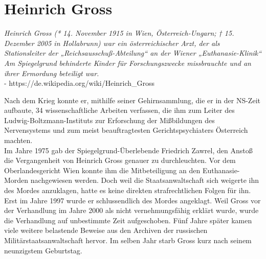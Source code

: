 \documentclass[a4paper, ngerman]{article}
\begin{document}
\section*{Heinrich Gross}

\begin{center}
    \textit{
        Heinrich Gross (* 14. November 1915 in Wien, Österreich-Ungarn; † 15. Dezember 2005 in Hollabrunn) war ein österreichischer Arzt, der als Stationsleiter der „Reichsausschuß-Abteilung“ an der Wiener
        „Euthanasie-Klinik“ Am Spiegelgrund behinderte Kinder für Forschungszwecke missbrauchte und an ihrer Ermordung beteiligt war.
    }
    \\ - https://de.wikipedia.org/wiki/Heinrich\_Gross
\end{center}

\noindent Nach dem Krieg konnte er, mithilfe seiner Gehirnsammlung, die er in der NS-Zeit aufbaute, 34 wissenschaftliche
Arbeiten verfassen, die ihm zum Leiter des Ludwig-Boltzmann-Instituts zur Erforschung der Mißbildungen des Nervensystems und
zum meist beauftragtesten Gerichtspsychiaters Österreich machten. \\

\noindent Im Jahre 1975 gab der Spiegelgrund-Überlebende Friedrich Zawrel, den Anstoß die Vergangenheit von
Heinrich Gross genauer zu durchleuchten. Vor dem Oberlandesgericht Wien konnte ihm die Mitbeteiligung
an den Euthanasie-Morden nachgewiesen werden. Doch weil die Staatsanwaltschaft sich weigerte ihn des Mordes
anzuklagen, hatte es keine direkten strafrechtlichen Folgen für ihn. \\

\noindent Erst im Jahre 1997 wurde er schlussendlich des Mordes angeklagt. Weil Gross vor der Verhandlung im
Jahre 2000 als nicht vernehmungsfähig erklärt wurde, wurde die Verhandlung auf unbestimmte Zeit aufgeschoben.
Fünf Jahre später kamen viele weitere belastende Beweise aus den Archiven der russischen Militärstaatsanwaltschaft
hervor. Im selben Jahr starb Gross kurz nach seinem neunzigstem Geburtstag.
\end{document}
